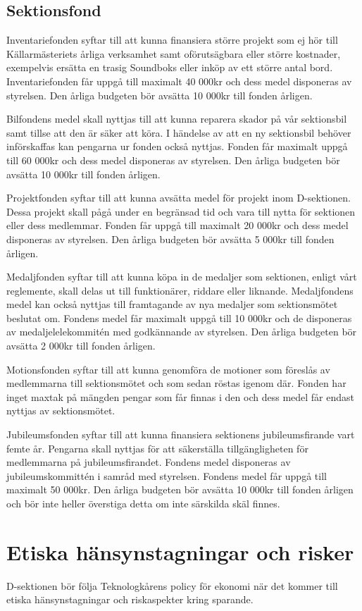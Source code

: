 \documentclass{dsekprotokoll}
\begin{document}
\subsection{Sektionsfond}
Inventariefonden syftar till att kunna finansiera större projekt som ej hör till Källarmästeriets årliga verksamhet samt oförutsägbara eller större kostnader, exempelvis ersätta en trasig Soundboks eller inköp av ett större antal bord. Inventariefonden får uppgå till maximalt 40 000kr och dess medel disponeras av styrelsen. Den årliga budgeten bör avsätta 10 000kr till fonden årligen.

Bilfondens medel skall nyttjas till att kunna reparera skador på vår sektionsbil samt tillse att den är säker att köra. I händelse av att en ny sektionsbil behöver införskaffas kan pengarna ur fonden också nyttjas. Fonden får maximalt uppgå till 60 000kr och dess medel disponeras av styrelsen. Den årliga budgeten bör avsätta 10 000kr till fonden årligen.

Projektfonden syftar till att kunna avsätta medel för projekt inom D-sektionen. Dessa projekt skall pågå under en begränsad tid och vara till nytta för sektionen eller dess medlemmar. Fonden får uppgå till maximalt 20 000kr och dess medel disponeras av styrelsen. Den årliga budgeten bör avsätta 5 000kr till fonden årligen.

Medaljfonden syftar till att kunna köpa in de medaljer som sektionen, enligt vårt reglemente, skall delas ut till funktionärer, riddare eller liknande. Medaljfondens medel kan också nyttjas till framtagande av nya medaljer som sektionsmötet beslutat om. Fondens medel får maximalt uppgå till 10 000kr och de disponeras av medaljelelekommitén med godkännande av styrelsen. Den årliga budgeten bör avsätta 2 000kr till fonden årligen.

Motionsfonden syftar till att kunna genomföra de motioner som föreslås av medlemmarna till sektionsmötet och som sedan röstas igenom där. Fonden har inget maxtak på mängden pengar som får finnas i den och dess medel får endast nyttjas av sektionsmötet.

Jubileumsfonden syftar till att kunna finansiera sektionens jubileumsfirande vart femte år. Pengarna skall nyttjas för att säkerställa tillgängligheten för medlemmarna på jubileumsfirandet. Fondens medel disponeras av jubileumskommittén i samråd med styrelsen. Fondens medel får uppgå till maximalt 50 000kr. Den årliga budgeten bör avsätta 10 000kr till fonden årligen och bör inte heller överstiga detta om inte särskilda skäl finnes.

\section{Etiska hänsynstagningar och risker}

D-sektionen bör följa Teknologkårens policy för ekonomi när det kommer till etiska hänsynstagningar och riskaspekter kring sparande.
\end{document}

